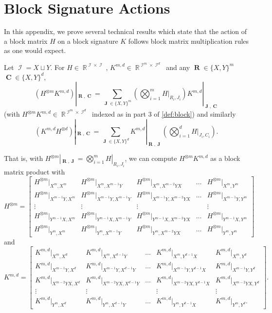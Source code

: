 \documentclass{theoretics}
\DeclareMathOperator{\rr}{\mathbb{R}}
\DeclareMathOperator{\vr}{\mathbf{R}}
\DeclareMathOperator{\vc}{\mathbf{C}}
\DeclareMathOperator{\vj}{\mathbf{J}}
\DeclareMathOperator{\ic}{\mathcal{I}}
\begin{document}
\section{Block Signature Actions}
\label{sec:appendix_block}
In this appendix, we prove several technical results which state that the action of a 
block matrix $H$ on a block signature $K$ follows block matrix multiplication rules as one would expect.
\begin{proposition}
    \label{prop:block}
    Let $\ic = X \sqcup Y$.
    For $H \in \rr^{\ic\times\ic}$, $K^{m,d} \in \rr^{\ic^m \times \ic^d}$ and any $\vr\in\{X,Y\}^m$
    $\vc\in\{X,Y\}^d$,
    \[
        (H^{\otimes m} K^{m,d})|_{\vr,\vc} = 
        \sum_{\vj \in \{X,Y\}^m} \left(\bigotimes_{i=1}^m H|_{R_i,J_i}\right) K^{m,d}|_{\vj,\vc}
    \]
    (with $H^{\otimes m} K^{m,d} \in \rr^{\ic^m \times \ic^d}$ 
    indexed as in part 3 of \autoref{def:block}) and similarly
    \[
        (K^{m,d}H^{\otimes d})|_{\vr,\vc} = 
        \sum_{\vj \in \{X,Y\}^d}  K^{m,d}|_{\vr,\vj}\left(\bigotimes_{i=1}^d H|_{J_i,C_i}\right).
    \]
\end{proposition}
That is, with $H^{\otimes m}|_{\vr,\vj} = \bigotimes_{i=1}^m H|_{R_i,J_i}$,
we can compute $H^{\otimes m}K^{m,d}$ as a block matrix product with
\[
    H^{\otimes m} = 
    \begin{bmatrix} 
        H^{\otimes m}|_{X^{m},X^{m}} &
        H^{\otimes m}|_{X^{m},X^{m-1}Y} & 
        H^{\otimes m}|_{X^{m},X^{m-2}YX} & \ldots & 
        H^{\otimes m}|_{X^{m},Y^{m}}\\
        H^{\otimes m}|_{X^{m-1}Y,X^{m}} &
        H^{\otimes m}|_{X^{m-1}Y,X^{m-1}Y} & 
        H^{\otimes m}|_{X^{m-1}Y,X^{m-2}YX} & \ldots & 
        H^{\otimes m}|_{X^{m-1}Y,Y^{m}}\\
        \vdots & \vdots & \vdots && \vdots \\
        H^{\otimes m}|_{Y^{m-1}X,X^{m}} & 
        H^{\otimes m}|_{Y^{m-1}X,X^{m-1}Y} &
        H^{\otimes m}|_{Y^{m-1}X,X^{m-2}YX} & \ldots & 
        H^{\otimes m}|_{Y^{m-1}X,Y^{m}}
        \\
        H^{\otimes m}|_{Y^{m},X^{m}} 
        & H^{\otimes m}|_{Y^{m},X^{m-1}Y} 
        & H^{\otimes m}|_{Y^{m},X^{m-2}YX} 
        & \ldots & H^{\otimes m}|_{Y^{m},Y^{m}} 
    \end{bmatrix}
\]
and
\[
    K^{m,d} =
    \begin{bmatrix} 
        K^{m,d}|_{X^{m},X^{d}} &
        K^{m,d}|_{X^{m},X^{d-1}Y} & \ldots &
        K^{m,d}|_{X^{m},Y^{d-1}X} & 
        K^{m,d}|_{X^{m},Y^{d}}\\
        K^{m,d}|_{X^{m-1}Y,X^{d}} &
        K^{m,d}|_{X^{m-1}Y,X^{d-1}Y} & \ldots & 
        K^{m,d}|_{X^{m-1}Y,Y^{d-1}X} & 
        K^{m,d}|_{X^{m-1}Y,Y^{d}}\\
        K^{m,d}|_{X^{m-2}YX,X^{d}} & 
        K^{m,d}|_{X^{m-2}YX,X^{d-1}Y} &\ldots & 
        K^{m,d}|_{X^{m-2}YX,Y^{d-1}X} & 
        K^{m,d}|_{X^{m-2}YX,Y^{d}} \\
        \vdots & \vdots && \vdots & \vdots \\
        K^{m,d}|_{Y^{m},X^{d}} &
        K^{m,d}|_{Y^{m},X^{d-1}Y} & \ldots & 
        K^{m,d}|_{Y^{m},Y^{d-1}X} &
        K^{m,d}|_{Y^{m},Y^{d}}.
    \end{bmatrix}.
\]
\end{document}
